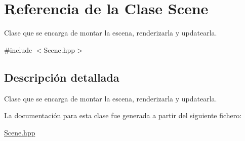 \hypertarget{class_scene}{}\section{Referencia de la Clase Scene}
\label{class_scene}


Clase que se encarga de montar la escena, renderizarla y updatearla.  




{\ttfamily \#include $<$Scene.\+hpp$>$}



\subsection{Descripción detallada}
Clase que se encarga de montar la escena, renderizarla y updatearla. 

La documentación para esta clase fue generada a partir del siguiente fichero\+:\begin{DoxyCompactItemize}
\item 
\mbox{\hyperlink{_scene_8hpp}{Scene.\+hpp}}\end{DoxyCompactItemize}
